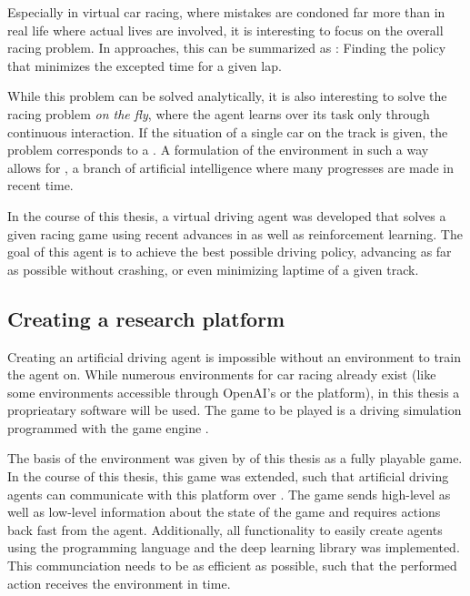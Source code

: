 Especially in virtual car racing, where mistakes are condoned far more than in real life where actual lives are involved, it is interesting to focus on the overall racing problem. In  approaches, this can be summarized as : Finding the policy that minimizes the excepted time for a given lap. 

While this problem can be solved analytically, it is also interesting to solve the racing problem \textit{on the fly}, where the agent learns over its task only through continuous interaction. If the situation of a single car on the track is given, the problem corresponds to a . A formulation of the environment in such a way allows for , a branch of artificial intelligence where many progresses are made in recent time.

In the course of this thesis, a virtual driving agent was developed that solves a given racing game using recent advances in  as well as reinforcement learning. The goal of this agent is to achieve the best possible driving policy, advancing as far as possible without crashing, or even minimizing laptime of a given track. 

\subsection{Creating a research platform}

Creating an artificial driving agent is impossible without an environment to train the agent on. While numerous environments for car racing already exist (like some environments accessible through OpenAI's  or the  platform), in this thesis a proprieatary software will be used. The game to be played is a driving simulation programmed with the game engine . 

The basis of the environment was given by \leon of this thesis as a fully playable game. In the course of this thesis, this game was extended, such that artificial driving agents can communicate with this platform over . The game sends high-level as well as low-level information about the state of the game and requires actions back fast from the agent. Additionally, all functionality to easily create agents using the programming language  and the deep learning library  was implemented. This communciation needs to be as efficient as possible, such that the performed action receives the environment in time.

